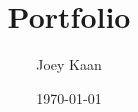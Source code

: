 \renewcommand{\contentsname}{Inhoudsopgave}

\title{Portfolio}
\author{Joey Kaan}
\date{\today}




\maketitle
\thispagestyle{empty}
\clearpage

